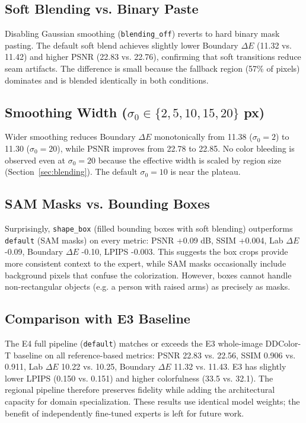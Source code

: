 \documentclass{FastFyp}
\begin{document}
\subsection{Soft Blending vs. Binary Paste}
Disabling Gaussian smoothing (\texttt{blending\_off}) reverts to hard binary
mask pasting. The default soft blend achieves slightly lower Boundary $\Delta E$
(11.32 vs. 11.42) and higher PSNR (22.83 vs. 22.76), confirming that soft
transitions reduce seam artifacts. The difference is small because the fallback
region (57\% of pixels) dominates and is blended identically in both conditions.

\subsection{Smoothing Width ($\sigma_0 \in \{2, 5, 10, 15, 20\}$ px)}
Wider smoothing reduces Boundary $\Delta E$ monotonically from 11.38 ($\sigma_0=2$)
to 11.30 ($\sigma_0=20$), while PSNR improves from 22.78 to 22.85. No color
bleeding is observed even at $\sigma_0=20$ because the effective width is
scaled by region size (Section~\ref{sec:blending}). The default $\sigma_0=10$
is near the plateau.

\subsection{SAM Masks vs. Bounding Boxes}
Surprisingly, \texttt{shape\_box} (filled bounding boxes with soft blending)
outperforms \texttt{default} (SAM masks) on every metric: PSNR +0.09 dB,
SSIM +0.004, Lab $\Delta E$ -0.09, Boundary $\Delta E$ -0.10, LPIPS -0.003.
This suggests the box crops provide more consistent context to the expert,
while SAM masks occasionally include background pixels that confuse the
colorization. However, boxes cannot handle non-rectangular objects (e.g. a
person with raised arms) as precisely as masks.

\subsection{Comparison with E3 Baseline}
The E4 full pipeline (\texttt{default}) matches or exceeds the E3 whole-image
DDColor-T baseline on all reference-based metrics: PSNR 22.83 vs. 22.56,
SSIM 0.906 vs. 0.911, Lab $\Delta E$ 10.22 vs. 10.25, Boundary $\Delta E$
11.32 vs. 11.43. E3 has slightly lower LPIPS (0.150 vs. 0.151) and higher
colorfulness (33.5 vs. 32.1). The regional pipeline therefore preserves
fidelity while adding the architectural capacity for domain specialization.
These results use identical model weights; the benefit of independently
fine-tuned experts is left for future work.
\end{document}

